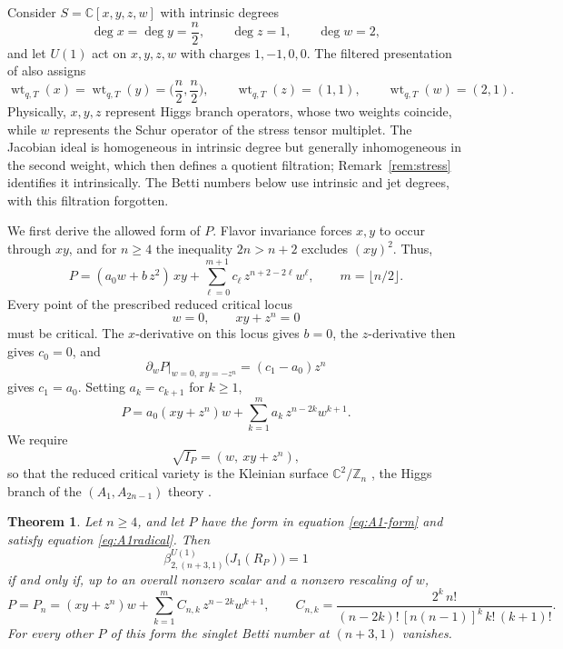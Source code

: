 \documentclass[10pt,reqno]{amsart}
\numberwithin{equation}{section}
\theoremstyle{plain}
\newtheorem{theorem}{Theorem}[section]
\theoremstyle{definition}
\DeclareMathOperator{\wt}{wt}
\begin{document}
Consider $S=\mathbb{C}[x,y,z,w]$ with intrinsic degrees
\begin{equation*}
	\deg x=\deg y=\frac n2,\qquad \deg z=1,\qquad \deg w=2,
\end{equation*}
and let $U(1)$ act on $x,y,z,w$ with charges $1,-1,0,0$.
The filtered presentation of \cite{KLSnonpoint} also assigns
\begin{equation}\label{eq:A1-qT}
	\wt_{q,T}(x)=\wt_{q,T}(y)=\big(\frac n2,\frac n2\big),\qquad \wt_{q,T}(z)=(1,1),\qquad \wt_{q,T}(w)=(2,1).
\end{equation}
Physically, $x,y,z$ represent Higgs branch operators, whose two weights coincide, while $w$ represents the Schur operator of the stress tensor multiplet. The Jacobian ideal is homogeneous in intrinsic degree but generally inhomogeneous in the second weight, which then defines a quotient filtration; Remark~\ref{rem:stress} identifies it intrinsically. The Betti numbers below use intrinsic and jet degrees, with this filtration forgotten.

We first derive the allowed form of $P$. Flavor invariance forces $x,y$ to occur through $xy$, and for $n\ge4$ the inequality $2n>n+2$ excludes $(xy)^2$. Thus,
\begin{equation*}
	P=(a_0w+b\,z^2)\,xy+\sum_{\ell=0}^{m+1}c_\ell\,z^{n+2-2\ell}w^\ell,\qquad m=\lfloor n/2\rfloor .
\end{equation*}
Every point of the prescribed reduced critical locus
\begin{equation*}
	w=0,\qquad xy+z^n=0
\end{equation*}
must be critical. The $x$-derivative on this locus gives $b=0$, the $z$-derivative then gives $c_0=0$, and 
\begin{equation*}
    \partial_wP|_{w=0,\,xy=-z^n}=(c_1-a_0)z^n
\end{equation*}
gives $c_1=a_0$. Setting $a_k=c_{k+1}$ for $k\ge1$,
\begin{equation}\label{eq:A1-form}
	P=a_0(xy+z^n)w+\sum_{k=1}^ma_k\,z^{n-2k}w^{k+1}.
\end{equation}
We require
\begin{equation}\label{eq:A1radical}
	\sqrt{I_P}=(w,\ xy+z^n),
\end{equation}
so that the reduced critical variety is the Kleinian surface $\mathbb{C}^2/\mathbb{Z}_n$ \cite{Slodowy}, the Higgs branch of the $(A_1,A_{2n-1})$ theory \cite{KLSnonpoint}.

\begin{theorem}\label{thm:A1}
Let $n\ge4$, and let $P$ have the form in equation \eqref{eq:A1-form} and satisfy equation \eqref{eq:A1radical}. Then
\begin{equation}
	\beta^{U(1)}_{2,(n+3,1)}\big(J_1(R_P)\big)=1
\end{equation}
if and only if, up to an overall nonzero scalar and a nonzero rescaling of $w$,
\begin{equation}\label{eq:Pn}
	P=P_n=(xy+z^n)w+\sum_{k=1}^mC_{n,k}\,z^{n-2k}w^{k+1},\qquad
	C_{n,k}=\frac{2^k\,n!}{(n-2k)!\,[n(n-1)]^k\,k!\,(k+1)!}.
\end{equation}
For every other $P$ of this form the singlet Betti number at $(n+3,1)$ vanishes.
\end{theorem}
\end{document}
